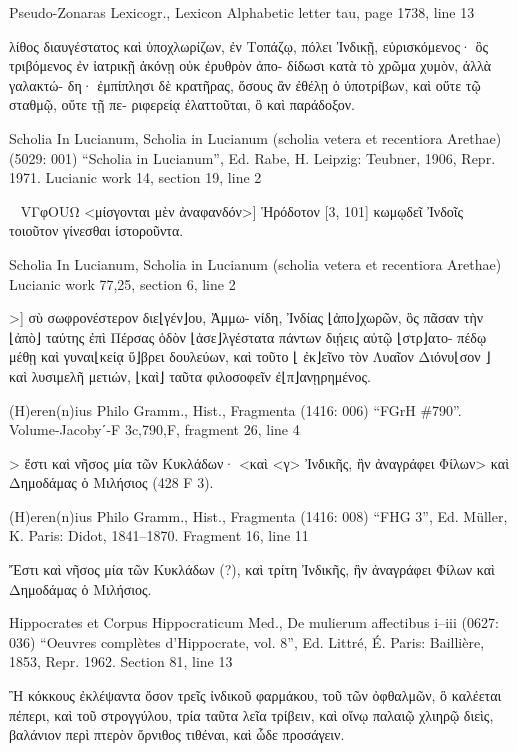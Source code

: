 \documentclass[12pt,letterpaper,twoside,final]{memoir}
\begin{document}
\begin{greek}
Pseudo-Zonaras Lexicogr., Lexicon 
Alphabetic letter tau, page 1738, line 13

                λίθος διαυγέστατος καὶ ὑποχλωρίζων, 
 ἐν Τοπάζῳ, πόλει Ἰνδικῇ, εὑρισκόμενος· ὃς 
 τριβόμενος ἐν ἰατρικῇ ἀκόνῃ οὐκ ἐρυθρὸν ἀπο-
 δίδωσι κατὰ τὸ χρῶμα χυμὸν, ἀλλὰ γαλακτώ-
 δη· ἐμπίπλησι δὲ κρατῆρας, ὅσους ἂν ἐθέλῃ ὁ 
 ὑποτρίβων, καὶ οὔτε τῷ σταθμῷ, οὔτε τῇ πε-
 ριφερείᾳ ἐλαττοῦται, ὃ καὶ παράδοξον. 




Scholia In Lucianum, Scholia in Lucianum (scholia vetera et recentiora Arethae) (5029: 001)
“Scholia in Lucianum”, Ed. Rabe, H.
Leipzig: Teubner, 1906, Repr. 1971.
Lucianic work 14, section 19, line 2

                                            ~ VΓφOUΩ 
<μίσγονται μὲν ἀναφανδόν>] Ἡρόδοτον [3, 101] κωμῳδεῖ 
Ἰνδοῖς τοιοῦτον γίνεσθαι ἱστοροῦντα. 



Scholia In Lucianum, Scholia in Lucianum (scholia vetera et recentiora Arethae) 
Lucianic work 77,25, section 6, line 2

                      >] σὺ σωφρονέστερον διε⌊γέν⌋ου, Ἀμμω-  
νίδη, Ἰνδίας ⌊ἀπο⌋χωρῶν, ὃς πᾶσαν τὴν ⌊ἀπὸ⌋ ταύτης ἐπὶ 
Πέρσας ὁδὸν ⌊ἀσε⌋λγέστατα πάντων διῄεις αὐτῷ ⌊στρ⌋ατο-
πέδῳ μέθῃ καὶ γυναι⌊κείᾳ ὕ⌋βρει δουλεύων, καὶ τοῦτο 
⌊  ἐκ⌋εῖνο τὸν Λυαῖον Διόνυ⌊σον  ⌋ καὶ λυσιμελῆ μετιών, 
⌊καὶ⌋ ταῦτα φιλοσοφεῖν ἐ⌊π⌋ανῃρημένος. 



(H)eren(n)ius Philo Gramm., Hist., Fragmenta (1416: 006)
“FGrH \#790”.
Volume-Jacobyʹ-F 3c,790,F, fragment 26, line 4

                                        > ἔστι καὶ νῆσος μία τῶν Κυκλάδων· 
<καὶ <γ> Ἰνδικῆς, ἣν ἀναγράφει Φίλων> καὶ Δημοδάμας ὁ Μιλήσιος 
(428 F 3). 



(H)eren(n)ius Philo Gramm., Hist., Fragmenta (1416: 008)
“FHG 3”, Ed. Müller, K.
Paris: Didot, 1841–1870.
Fragment 16, line 11

                                               Ἔστι καὶ 
νῆσος μία τῶν Κυκλάδων (?), καὶ τρίτη Ἰνδικῆς, 
ἣν ἀναγράφει Φίλων καὶ Δημοδάμας ὁ Μιλήσιος. 



Hippocrates et Corpus Hippocraticum Med., De mulierum affectibus i–iii (0627: 036)
“Oeuvres complètes d'Hippocrate, vol. 8”, Ed. Littré, É.
Paris: Baillière, 1853, Repr. 1962.
Section 81, line 13

                  Ἢ κόκκους ἐκλέψαντα ὅσον τρεῖς ἰνδικοῦ φαρμάκου, 
τοῦ τῶν ὀφθαλμῶν, ὃ καλέεται πέπερι, καὶ τοῦ στρογγύλου, τρία 
ταῦτα λεῖα τρίβειν, καὶ οἴνῳ παλαιῷ χλιηρῷ διεὶς, βαλάνιον περὶ 
πτερὸν ὄρνιθος τιθέναι, καὶ ὧδε προσάγειν. 




\end{greek}
\end{document}
